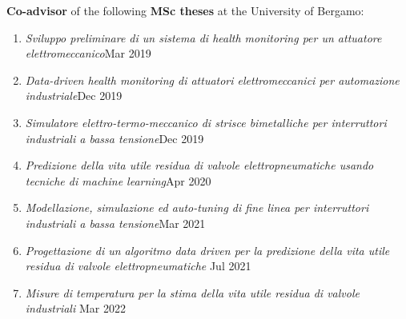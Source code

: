 \documentclass[10pt]{article}
\begin{document}
\textbf{Co-advisor} of the following \textbf{MSc theses} at the University of Bergamo:
\vspace{-6pt}
\begin{enumerate}
	\setlength\itemsep{-6pt}
	\item \textit{Sviluppo preliminare di un sistema di health monitoring per un attuatore elettromeccanico}\hfill Mar 2019\\
	\vspace{-2pt}{\scriptsize Advisor: prof. F. Previdi \hfill Students: Davide Palazzini, Alen Preda}
	\item \textit{Data-driven health monitoring di attuatori elettromeccanici per automazione industriale}\hfill Dec 2019\\
	\vspace{-2pt}{\scriptsize Advisor: prof. F. Previdi \hfill Students: Davide Presciani, Matteo Gusmini}
	\item \textit{Simulatore elettro-termo-meccanico di strisce bimetalliche per interruttori industriali a bassa tensione}\hfill Dec 2019\\
	\vspace{-2pt}{\scriptsize Advisor: prof. F. Previdi \hfill Student: Paolo Pasinetti}
	\item \textit{Predizione della vita utile residua di valvole elettropneumatiche usando tecniche di machine learning}\hfill Apr 2020\\
	\vspace{-2pt}{\scriptsize Advisor: prof. F. Previdi \hfill Student: Angela Pomata}
	\item \textit{Modellazione, simulazione ed auto-tuning di fine linea per interruttori industriali a bassa tensione}\hfill Mar 2021\\
	\vspace{-2pt}{\scriptsize Advisor: prof. F. Previdi \hfill Student: Simone Zanni}
	\item \textit{Progettazione di un algoritmo data driven
	per la predizione della vita utile residua di
	valvole elettropneumatiche} \hfill Jul 2021\\
	\vspace{-2pt}{\scriptsize Advisor: prof. F. Previdi \hfill Student: Simone Sudati}
	\item \textit{Misure di temperatura per la stima della vita utile residua di valvole industriali} \hfill Mar 2022\\
	\vspace{-2pt}{\scriptsize Advisor: prof. F. Previdi \hfill Student: Michele Brillante}
\end{enumerate}
\end{document}
